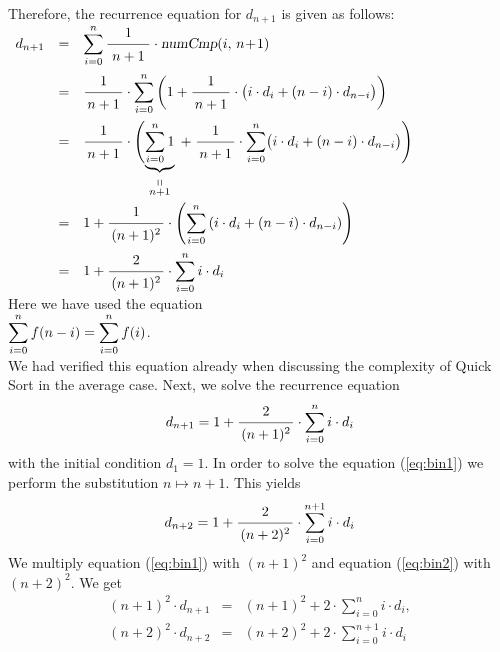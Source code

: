 Therefore, the recurrence equation for $d_{n+1}$ is given as follows: 
\\[0.2cm]
\hspace*{1.3cm}
$
\begin{array}{lcl}
d_{n+1} 
& = &  
\ds\sum\limits_{i=0}^n \bruch{1}{\,n+1\,} \cdot \textsl{numCmp}(i,\,n\!+\!1)  \\[0.5cm]
& = &  
\ds\bruch{1}{n+1} \cdot \sum\limits_{i=0}^n  
           \left(1 + \bruch{1}{n+1} \cdot \bigl(i \cdot d_i + (n-i) \cdot d_{n-i} \bigr) \right)
\\[0.5cm]
& = &  
\bruch{1}{n+1} \cdot \Biggl(\underbrace{\sum\limits_{i=0}^n 1}_{\stackrel{\displaystyle \shortparallel}{n+1}} \;+\;
           \bruch{1}{n+1} \cdot \ds\sum\limits_{i=0}^n \bigl(i \cdot d_i + (n-i) \cdot d_{n-i} \bigr) \Biggr)
\\[1.3cm]
& = &  
1 + \bruch{1}{(n+1)^2} \cdot \left(\ds\sum\limits_{i=0}^n \left(i\cdot d_i + (n-i)\cdot d_{n-i}\right) \right) 
\\[0.5cm]
& = &  
1 + \bruch{2}{(n+1)^2} \cdot \ds\sum\limits_{i=0}^n i\cdot d_i 
\end{array}
$
\\[0.2cm]
Here we have used the equation  \\[0.2cm]
\hspace*{1.3cm}
$\displaystyle\sum\limits_{i=0}^n f(n-i) = \sum\limits_{i=0}^n f(i)$. \\[0.2cm]
We had verified this equation already when discussing the complexity of Quick Sort in the average
case.  Next, we solve the recurrence equation 
\begin{equation}
  \label{eq:bin1}
d_{n+1} = \displaystyle 1 + \bruch{2}{(n+1)^2} \cdot \sum\limits_{i=0}^n i\cdot d_i  
\end{equation}
with the initial condition $d_1 = 1$.  
In order to solve the equation (\ref{eq:bin1}) we perform the substitution $n \mapsto n+1$.  This yields
\begin{equation}
  \label{eq:bin2}
d_{n+2} = \displaystyle 1 + \bruch{2}{(n+2)^2} \cdot \sum\limits_{i=0}^{n+1} i\cdot d_i  
\end{equation}
We multiply equation (\ref{eq:bin1}) with $(n+1)^2$ and equation (\ref{eq:bin2}) 
with $(n+2)^2$.  We get
\begin{eqnarray}
  \label{eq:bin3}
(n+1)^2 \cdot d_{n+1} & = & (n+1)^2 + 2 \cdot \sum\limits_{i=0}^n i\cdot d_i, \\
  \label{eq:bin4}
(n+2)^2 \cdot d_{n+2} & = & (n+2)^2 + 2 \cdot \sum\limits_{i=0}^{n+1} i\cdot d_i
\end{eqnarray}

